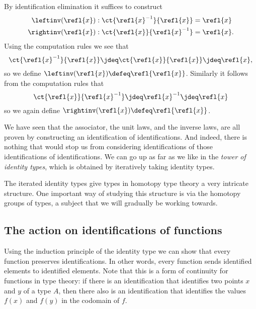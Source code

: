 \begin{constr}
By identification elimination it suffices to construct
\begin{align*}
\leftinv(\refl{x}) & : \ct{\refl{x}^{-1}}{\refl{x}} = \refl{x} \\
\rightinv(\refl{x}) & : \ct{\refl{x}}{\refl{x}^{-1}} = \refl{x}.
\end{align*}
Using the computation rules we see that
\begin{equation*}
\ct{\refl{x}^{-1}}{\refl{x}}\jdeq \ct{\refl{x}}{\refl{x}}\jdeq\refl{x},
\end{equation*}
so we define $\leftinv(\refl{x})\defeq \refl{\refl{x}}$. Similarly it follows from the computation rules that
\begin{equation*}
\ct{\refl{x}}{\refl{x}^{-1}} \jdeq \refl{x}^{-1}\jdeq \refl{x}
\end{equation*}
so we again define $\rightinv(\refl{x})\defeq\refl{\refl{x}}$. 
\end{constr}

\begin{rmk}
  We have seen that the associator, the unit laws, and the inverse laws, are all proven by constructing an identification of identifications. And indeed, there is nothing that would stop us from considering identifications of those identifications of identifications. We can go up as far as we like in the \emph{tower of identity types}, which is obtained by iteratively taking identity types.

  The iterated identity types give types in homotopy type theory a very intricate structure. One important way of studying this structure is via the homotopy groups of types, a subject that we will gradually be working towards.
\end{rmk}

\subsection{The action on identifications of functions}

Using the induction principle of the identity type we can show that every function preserves identifications.
In other words, every function sends identified elements to identified elements.
Note that this is a form of continuity for functions in type theory: if there is an identification that identifies two points $x$ and $y$ of a type $A$, then there also is an identification that identifies the values $f(x)$ and $f(y)$ in the codomain of $f$. 

